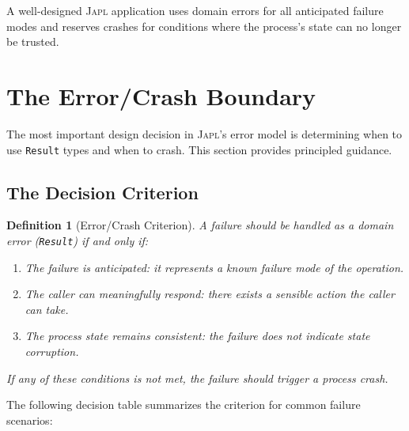 \documentclass[11pt,twocolumn]{article}
\newtheorem{definition}[theorem]{Definition}
\newcommand{\japl}{\textsc{Japl}}
\newcommand{\Result}{\texttt{Result}}
\begin{document}
A well-designed \japl{} application uses domain errors for all anticipated failure modes and reserves crashes for conditions where the process's state can no longer be trusted.

\section{The Error/Crash Boundary}\label{sec:boundary}

The most important design decision in \japl{}'s error model is determining when to use \Result{} types and when to crash. This section provides principled guidance.

\subsection{The Decision Criterion}

\begin{definition}[Error/Crash Criterion]
A failure should be handled as a domain error (\Result{}) if and only if:
\begin{enumerate}
  \item The failure is \emph{anticipated}: it represents a known failure mode of the operation.
  \item The caller can \emph{meaningfully respond}: there exists a sensible action the caller can take.
  \item The process state remains \emph{consistent}: the failure does not indicate state corruption.
\end{enumerate}
If any of these conditions is not met, the failure should trigger a process crash.
\end{definition}

\medskip

The following decision table summarizes the criterion for common failure scenarios:
\end{document}
